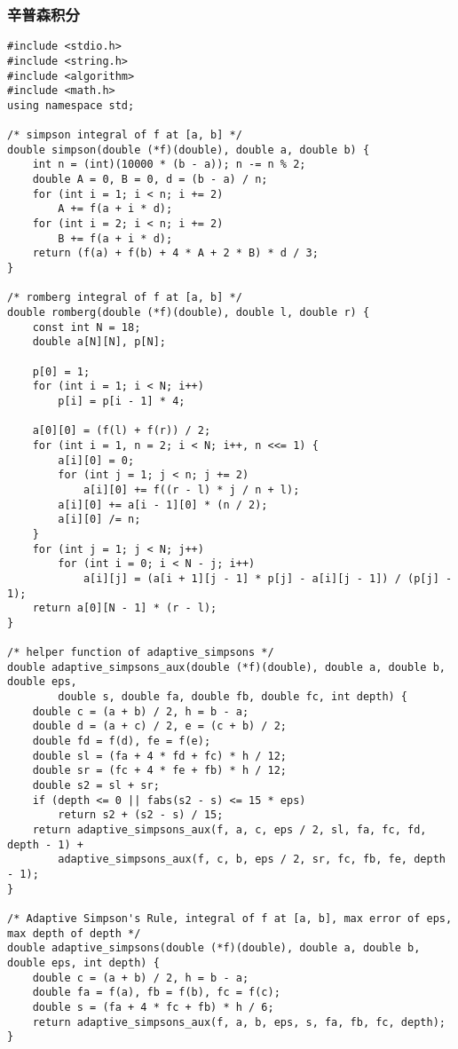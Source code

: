\subsubsection{辛普森积分}
\begin{verbatim}
#include <stdio.h>
#include <string.h>
#include <algorithm>
#include <math.h>
using namespace std;

/* simpson integral of f at [a, b] */
double simpson(double (*f)(double), double a, double b) {
    int n = (int)(10000 * (b - a)); n -= n % 2;
    double A = 0, B = 0, d = (b - a) / n;
    for (int i = 1; i < n; i += 2)
        A += f(a + i * d);
    for (int i = 2; i < n; i += 2)
        B += f(a + i * d);
    return (f(a) + f(b) + 4 * A + 2 * B) * d / 3;
}

/* romberg integral of f at [a, b] */
double romberg(double (*f)(double), double l, double r) {
    const int N = 18;
    double a[N][N], p[N];

    p[0] = 1;
    for (int i = 1; i < N; i++)
        p[i] = p[i - 1] * 4;

    a[0][0] = (f(l) + f(r)) / 2;
    for (int i = 1, n = 2; i < N; i++, n <<= 1) {
        a[i][0] = 0;
        for (int j = 1; j < n; j += 2)
            a[i][0] += f((r - l) * j / n + l);
        a[i][0] += a[i - 1][0] * (n / 2);
        a[i][0] /= n;
    }
    for (int j = 1; j < N; j++)
        for (int i = 0; i < N - j; i++)
            a[i][j] = (a[i + 1][j - 1] * p[j] - a[i][j - 1]) / (p[j] - 1);
    return a[0][N - 1] * (r - l);
}

/* helper function of adaptive_simpsons */
double adaptive_simpsons_aux(double (*f)(double), double a, double b, double eps,
        double s, double fa, double fb, double fc, int depth) {
    double c = (a + b) / 2, h = b - a;
    double d = (a + c) / 2, e = (c + b) / 2;
    double fd = f(d), fe = f(e);
    double sl = (fa + 4 * fd + fc) * h / 12;
    double sr = (fc + 4 * fe + fb) * h / 12;
    double s2 = sl + sr;
    if (depth <= 0 || fabs(s2 - s) <= 15 * eps)
        return s2 + (s2 - s) / 15;
    return adaptive_simpsons_aux(f, a, c, eps / 2, sl, fa, fc, fd, depth - 1) +
        adaptive_simpsons_aux(f, c, b, eps / 2, sr, fc, fb, fe, depth - 1);
}

/* Adaptive Simpson's Rule, integral of f at [a, b], max error of eps, max depth of depth */
double adaptive_simpsons(double (*f)(double), double a, double b, double eps, int depth) {
    double c = (a + b) / 2, h = b - a;
    double fa = f(a), fb = f(b), fc = f(c);
    double s = (fa + 4 * fc + fb) * h / 6;
    return adaptive_simpsons_aux(f, a, b, eps, s, fa, fb, fc, depth);
}
\end{verbatim}
